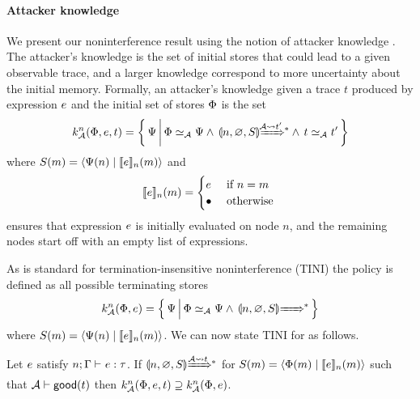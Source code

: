 \paragraph{Attacker knowledge}
We present our noninterference result using the notion of attacker knowledge \cite{Askarov:2008:TNL:1462455.1462485, 4223226}. The attacker's knowledge is the set of initial stores that could lead to a given observable trace, and a larger knowledge correspond to more uncertainty about the initial memory. Formally, an attacker's knowledge given a trace $t$ produced by expression $e$ and the initial set of stores $\Phi$ is the set
\begin{equation*}
k^n_{\Attacker}(\globalstore, \expr, t) = \left\{ \, \altglobalstore \, \middle\vert \, \globalstore \simeq_{\Attacker} \altglobalstore \wedge \, \gconfig{n}{\emptyenv}{S} \gstepstos[][\Attacker \filtertrace t'] \wedge \, t \simeq_{\Attacker} t' \, \right\}
\end{equation*}
where $S(m) = \langle \Psi(n) \mid \llbracket e \rrbracket_n(m) \rangle$ and
\begin{equation*}
\llbracket e \rrbracket_n(m) =
\begin{cases}
e & \text{ if } n = m\\
\bullet & \text{ otherwise }
\end{cases}
\end{equation*}
ensures that expression $e$ is initially evaluated on node $n$, and the remaining nodes start off with an empty list of expressions.

As is standard for termination-insensitive noninterference (TINI) the policy \cite{6234468} is defined as all possible terminating stores
\begin{equation*}
k^n_{\Attacker}(\globalstore, \expr) = \left\{ \,\altglobalstore \, \middle\vert \, \globalstore \simeq_{\Attacker} \altglobalstore \wedge \, \gconfig{n}{\emptyenv}{S} \gstepstos \, \right\}
\end{equation*}
where $S(m) = \langle \Psi(n) \mid \llbracket e \rrbracket_n(m) \rangle$. We can now state TINI for \lang{} as follows.

\begin{theorem}[Noninterference]\label{thm:ni}
Let $e$ satisfy $\hastype{n; \tenv}{\expr}{\type}$.
If $\gconfig{n}{\varnothing}{S} \gstepstos[][\Attacker \filtertrace t]$ for $S(m) = \langle \Phi(m) \mid \llbracket e \rrbracket_n(m) \rangle$ such that $\mathcal{A} \vdash \mathsf{good}(t)$ then $k^n_{\mathcal{A}}(\Phi, e, t) \supseteq k^n_{\mathcal{A}}(\Phi, e)$.
\end{theorem}

